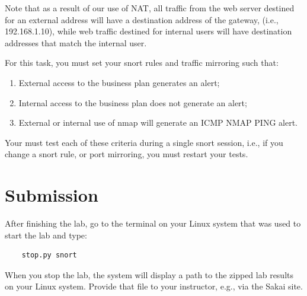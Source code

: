 Note that as a result of our use of NAT, all traffic from the web server destined for an
external address will have a destination address of the gateway, (i.e., 192.168.1.10), 
while web traffic destined for internal users will have destination addresses that match the internal user.

For this task, you must set your snort rules and traffic mirroring such that:
\begin{enumerate}
\item External access to the business plan generates an alert;
\item Internal access to the business plan does not generate an alert;
\item External or internal use of nmap will generate an ICMP NMAP PING alert.
\end{enumerate}
Your must test each of these criteria during a single snort session, i.e., if you change
a snort rule, or port mirroring, you must restart your tests.

\section{Submission}
After finishing the lab, go to the terminal on your Linux system that was used to start the lab and type:
\begin{verbatim}
    stop.py snort
\end{verbatim}
When you stop the lab, the system will display a path to the zipped lab results on your Linux system.  Provide that file to 
your instructor, e.g., via the Sakai site.


